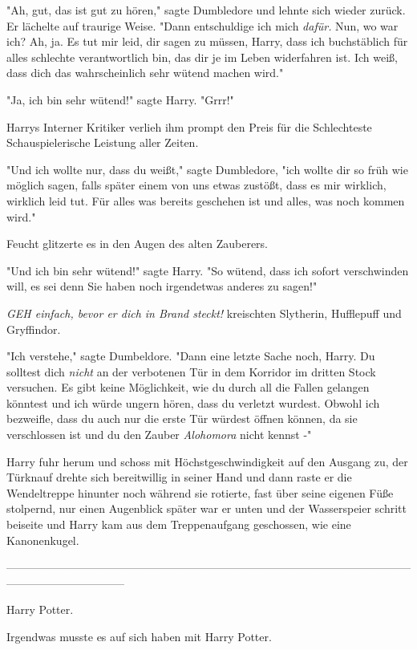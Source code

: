 {"Ah, gut, das ist gut zu hören," sagte Dumbledore und lehnte sich wieder zurück. Er lächelte auf traurige Weise. "Dann entschuldige ich mich \emph{dafür.} Nun, wo war ich? Ah, ja. Es tut mir leid, dir sagen zu müssen, Harry, dass ich buchstäblich für alles schlechte verantwortlich bin, das dir je im Leben widerfahren ist. Ich weiß, dass dich das wahrscheinlich sehr wütend machen wird."

"Ja, ich bin sehr wütend!" sagte Harry. "Grrr!"

Harrys Interner Kritiker verlieh ihm prompt den Preis für die Schlechteste Schauspielerische Leistung aller Zeiten.

"Und ich wollte nur, dass du weißt," sagte Dumbledore, "ich wollte dir so früh wie möglich sagen, falls später einem von uns etwas zustößt, dass es mir wirklich, wirklich leid tut. Für alles was bereits geschehen ist und alles, was noch kommen wird."

Feucht glitzerte es in den Augen des alten Zauberers.

"Und ich bin sehr wütend!" sagte Harry. "So wütend, dass ich sofort verschwinden will, es sei denn Sie haben noch irgendetwas anderes zu sagen!"

\emph{GEH einfach, bevor er dich in Brand steckt!} kreischten Slytherin, Hufflepuff und Gryffindor.

"Ich verstehe," sagte Dumbeldore. "Dann eine letzte Sache noch, Harry. Du solltest dich \emph{nicht} an der verbotenen Tür in dem Korridor im dritten Stock versuchen. Es gibt keine Möglichkeit, wie du durch all die Fallen gelangen könntest und ich würde ungern hören, dass du verletzt wurdest. Obwohl ich bezweifle, dass du auch nur die erste Tür würdest öffnen können, da sie verschlossen ist und du den Zauber \emph{Alohomora} nicht kennst -"

Harry fuhr herum und schoss mit Höchstgeschwindigkeit auf den Ausgang zu, der Türknauf drehte sich bereitwillig in seiner Hand und dann raste er die Wendeltreppe hinunter noch während sie rotierte, fast über seine eigenen Füße stolpernd, nur einen Augenblick später war er unten und der Wasserspeier schritt beiseite und Harry kam aus dem Treppenaufgang geschossen, wie eine Kanonenkugel.

--------------------------------------------------------------------------------------------------------------------------------------------

Harry Potter.

Irgendwas musste es auf sich haben mit Harry Potter.

}
